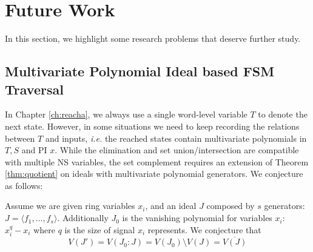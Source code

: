 \section{Future Work}
In this section, we highlight some research problems that deserve further study.
\subsection{Multivariate Polynomial Ideal based FSM Traversal}
In Chapter \ref{ch:reacha}, we always use a single word-level variable $T$ to denote the
next state. However, in some situations we need to keep recording the relations between $T$ and
inputs, {\it i.e.} the reached states contain multivariate polynomials in $T,S$ and PI $x$. 
While the elimination and set union/intersection are compatible with multiple NS variables,
the set complement requires an extension of Theorem \ref{thm:quotient} on ideals with 
multivariate polynomial generators. We conjecture as follows:

\begin{Conjecture}
Assume we are given ring variables $x_i$, and an ideal $J$ composed by $s$ generators:
$J = \langle f_1,\dots, f_s\rangle$.  Additionally $J_0$ is the vanishing polynomial for variables
$x_i$: $ x_i^{q} - x_i$ where $q$ is the size of signal $x_i$ represents.
We conjecture that
$$V(J') = V(J_0:J) = V(J_0)\setminus V(J) = \overline{V(J)}$$
\end{Conjecture}

